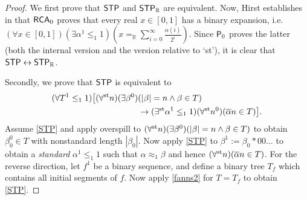 \documentclass[reqno]{amsart}
\def\STP{\textup{\textsf{STP}}}
\def\RCA{\textup{\textsf{RCA}}}
\def\P{\textup{\textsf{P}}}
\def\R{{\mathbb  R}}
\def\R{{\mathbb{R}}}
\def\st{\textup{st}}
\def\asa{\leftrightarrow}
\def\di{\rightarrow}
\numberwithin{equation}{section}
\numberwithin{thm}{section}
\begin{document}
\begin{proof}    
We first prove that $\STP$ and $\STP_{\R}$ are equivalent.  Now, Hirst establishes in \cite{polahirst} that $\RCA_{0}$ proves that every real $x\in [0,1]$ has a binary expansion, i.e.\ $(\forall x\in [0,1])(\exists \alpha^{1}\leq_{1}1)(x=_{\R}\sum_{i=0}^{\infty}\frac{\alpha(i)}{2^{i}})$. 
Since $\P_{0}$ proves the latter (both the internal version and the version relative to `st'), it is clear that $\STP\asa \STP_{\R}$.  

\medskip

Secondly, we prove that $\STP$ is equivalent to 
\begin{align}\label{fanns2}
(\forall T^{1}\leq_{1}1)\big[(\forall^{\st}n)(\exists \beta^{0})&(|\beta|=n \wedge \beta\in T ) \\
&\di (\exists^{\st}\alpha^{1}\leq_{1}1)(\forall^{\st}n^{0})(\overline{\alpha}n\in T)   \big].\notag
\end{align}
Assume \ref{STP} and apply overspill to $(\forall^{\st}n)(\exists \beta^{0})(|\beta|=n \wedge \beta\in T )$ to obtain $\beta_{0}^{0}\in T$ with nonstandard length $|\beta_{0}|$.  
Now apply \ref{STP} to $\beta^{1}:=\beta_{0}*00\dots$ to obtain a \emph{standard} $\alpha^{1}\leq_{1}1$ such that $\alpha\approx_{1}\beta$ and hence $(\forall^{\st}n)(\overline{\alpha}n\in T)$.  
For the reverse direction, let $f^{1}$ be a binary sequence, and define a binary tree $T_{f}$ which contains all initial segments of $f$.  
Now apply \eqref{fanns2} for $T=T_{f}$ to obtain \ref{STP}.  

\medskip


\end{proof}
\end{document}
